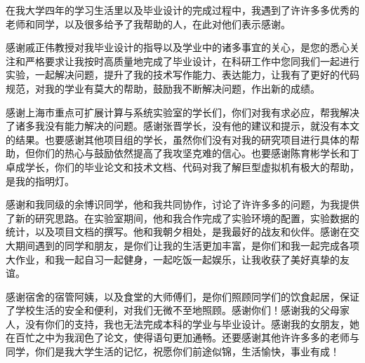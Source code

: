 \begin{thanks}
在我大学四年的学习生活里以及毕业设计的完成过程中，我遇到了许许多多优秀的老师和同学，以及很多给予了我帮助的人，在此对他们表示感谢。

感谢戚正伟教授对我毕业设计的指导以及学业中的诸多事宜的关心，是您的悉心关注和严格要求让我按时高质量地完成了毕业设计，在科研工作中您同我们一起进行实验，一起解决问题，提升了我的技术写作能力、表达能力，让我有了更好的代码规范，对我的学业有莫大的帮助，鼓励我不断解决问题，作出新的成绩。

感谢上海市重点可扩展计算与系统实验室的学长们，你们对我有求必应，帮我解决了诸多我没有能力解决的问题。感谢张晋学长，没有他的建议和提示，就没有本文的结果。也要感谢其他项目组的学长，虽然你们没有对我的研究项目进行具体的帮助，但你们的热心与鼓励依然提高了我攻坚克难的信心。也要感谢陈育彬学长和丁卓成学长，你们的毕业论文和技术文档、代码对我了解巨型虚拟机有极大的帮助，是我的指明灯。

感谢和我同级的余博识同学，他和我共同协作，讨论了许许多多的问题，为我提供了新的研究思路。在实验室期间，他和我合作完成了实验环境的配置，实验数据的统计，以及项目文档的撰写。他和我朝夕相处，是我最好的战友和伙伴。感谢在交大期间遇到的同学和朋友，是你们让我的生活更加丰富，是你们和我一起完成各项大作业，和我一起自习一起健身，一起吃饭一起娱乐，让我收获了美好真挚的友谊。

感谢宿舍的宿管阿姨，以及食堂的大师傅们，是你们照顾同学们的饮食起居，保证了学校生活的安全和便利，对我们无微不至地照顾。感谢你们！感谢我的父母家人，没有你们的支持，我也无法完成本科的学业与毕业设计。感谢我的女朋友，她在百忙之中为我润色了论文，使得语句更加通畅。还要感谢其他许许多多的老师与同学，你们是我大学生活的记忆，祝愿你们前途似锦，生活愉快，事业有成！

  

\end{thanks}
